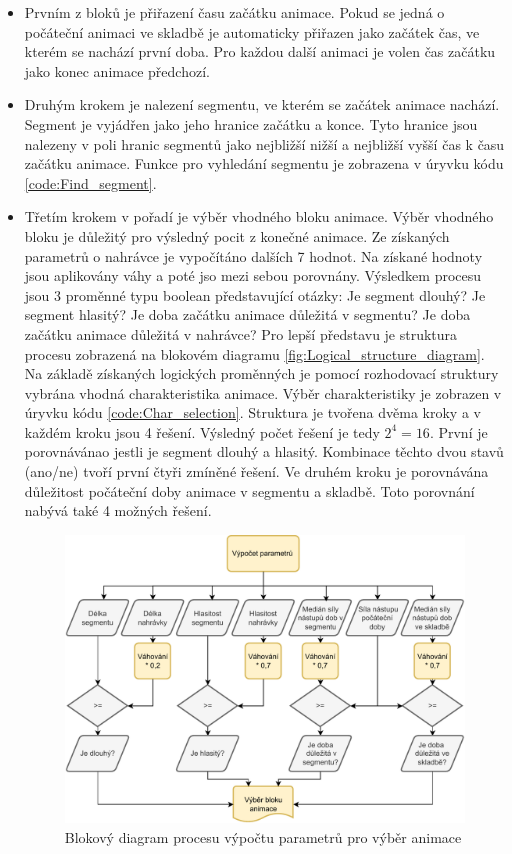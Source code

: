 \begin{itemize}
    \item  
    Prvním z bloků je přiřazení času začátku animace. Pokud se jedná o počáteční animaci ve skladbě je automaticky přiřazen jako začátek čas, ve kterém se nachází první doba. Pro každou další animaci je volen čas začátku jako konec animace předchozí. 
    \item 
    Druhým krokem je nalezení segmentu, ve kterém se začátek animace nachází. Segment je vyjádřen jako jeho hranice začátku a konce. Tyto hranice jsou nalezeny v poli hranic segmentů jako nejbližší nižší a nejbližší vyšší čas k času začátku animace. Funkce pro vyhledání segmentu je zobrazena v úryvku kódu \ref{code:Find_segment}. 

    \item 
    Třetím krokem v pořadí je výběr vhodného bloku animace. Výběr vhodného bloku je důležitý pro výsledný pocit z konečné animace. Ze získaných parametrů o nahrávce je vypočítáno dalších 7 hodnot. Na získané hodnoty jsou aplikovány váhy a poté jso mezi sebou porovnány. Výsledkem procesu jsou 3 proměnné typu boolean představující otázky: Je segment dlouhý? Je segment hlasitý? Je doba začátku animace důležitá v segmentu? Je doba začátku animace důležitá v nahrávce? Pro lepší představu je struktura procesu zobrazená na blokovém diagramu \ref{fig:Logical_structure_diagram}. Na základě získaných logických proměnných je pomocí rozhodovací struktury vybrána vhodná charakteristika animace. Výběr charakteristiky je zobrazen v úryvku kódu \ref{code:Char_selection}. Struktura je tvořena dvěma kroky a v každém kroku jsou 4 řešení. Výsledný počet řešení je tedy $2^4 = 16$. První je porovnávánao jestli je segment dlouhý a hlasitý. Kombinace těchto dvou stavů (ano/ne) tvoří první čtyři zmíněné řešení. Ve druhém kroku je porovnávána důležitost počáteční doby animace v segmentu a skladbě. Toto porovnání nabývá také 4 možných řešení.  

    \begin{figure}[H]
        \centering
        \includegraphics[width = 1\linewidth]{obrazky/UML_diagramy_anim_bock_selection _part_1.pdf}
        \caption{Blokový diagram procesu výpočtu parametrů pro výběr animace}
        \label{fig:Anim_block_param_selection_diagram}
    \end{figure}


\end{itemize}
